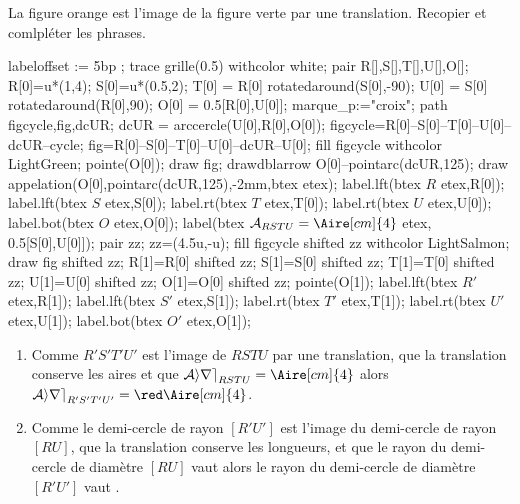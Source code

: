 \begin{corrige}
    La figure orange est l'image de la figure verte par une translation. Recopier et comlpléter les phrases.
    \begin{Geometrie}[CoinHD={(8u,5u)}]
        labeloffset := 5bp ;
        trace grille(0.5) withcolor white;
        pair R[],S[],T[],U[],O[];
        R[0]=u*(1,4);
        S[0]=u*(0.5,2);
        T[0] = R[0] rotatedaround(S[0],-90);
        U[0] = S[0] rotatedaround(R[0],90);
        O[0] = 0.5[R[0],U[0]];
        marque_p:="croix";
        path figcycle,fig,dcUR;        
        dcUR = arccercle(U[0],R[0],O[0]);
        figcycle=R[0]--S[0]--T[0]--U[0]--dcUR--cycle;
        fig=R[0]--S[0]--T[0]--U[0]--dcUR--U[0];
        fill figcycle withcolor LightGreen;
        pointe(O[0]);
        draw fig;
        drawdblarrow O[0]--pointarc(dcUR,125);
        draw appelation(O[0],pointarc(dcUR,125),-2mm,btex \small {} etex);
        label.lft(btex $R$ etex,R[0]);
        label.lft(btex $S$ etex,S[0]);
        label.rt(btex $T$ etex,T[0]);
        label.rt(btex $U$ etex,U[0]);
        label.bot(btex $O$ etex,O[0]);
        label(btex \footnotesize $\mathcal{A}_{RSTU}=\Aire[cm]{4}$ etex, 0.5[S[0],U[0]]);
        pair zz;
        zz=(4.5u,-u);
        fill figcycle shifted zz withcolor LightSalmon;
        draw fig shifted zz;
        R[1]=R[0] shifted zz;
        S[1]=S[0] shifted zz;
        T[1]=T[0] shifted zz;
        U[1]=U[0] shifted zz;
        O[1]=O[0] shifted zz;
        pointe(O[1]);        
        label.lft(btex $R'$ etex,R[1]);
        label.lft(btex $S'$ etex,S[1]);
        label.rt(btex $T'$ etex,T[1]);
        label.rt(btex $U'$ etex,U[1]);
        label.bot(btex $O'$ etex,O[1]);
\end{Geometrie}
    \begin{enumerate}
        \item Comme {\red $R'S'T'U'$ est l'image de $RSTU$ par une translation, que la translation conserve les aires} et que $\mathcal{Aire}_{RSTU}=\Aire[cm]{4}$ alors $\mathcal{Aire}_{R'S'T'U'}={\red \Aire[cm]{4}}$.
        \item Comme {\red le demi-cercle de rayon $[R'U']$ est l'image du demi-cercle de rayon $[RU]$, que la translation conserve les longueurs,} et que le rayon du demi-cercle de diamètre $[RU]$ vaut  alors le rayon du demi-cercle de diamètre $[R'U']$ vaut {\red {}}.
    \end{enumerate}
\end{corrige}

